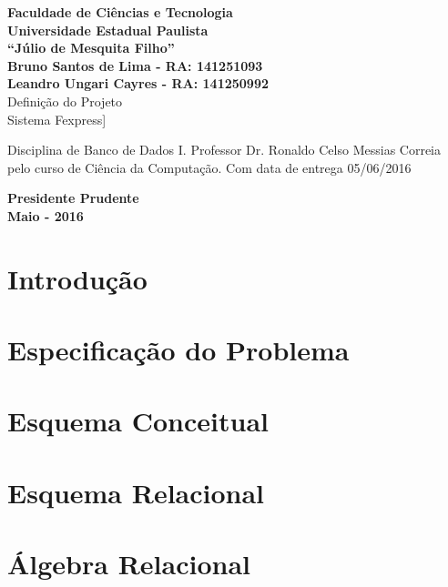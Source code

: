 \documentclass[12pt, onecolumn, titlepage]{article}
\begin{document}

\begin{titlepage} %
	
	\vfill
	\begin{center}
	
		{\large \textbf{Faculdade de Ciências e Tecnologia\\Universidade Estadual Paulista\\``Júlio de Mesquita Filho''}} \\[3cm]
		{\large \textbf{Bruno Santos de Lima - RA: 141251093}}\\
		{\large \textbf{Leandro Ungari Cayres - RA: 141250992}}\\[3cm]
		{\Large Definição do Projeto}\\
		{\Large Sistema Fexpress]}\\[3cm]

	\hspace{.45\textwidth} %
	\begin{minipage}{.5\textwidth}
		\large Disciplina de Banco de Dados I. Professor Dr. Ronaldo Celso Messias Correia pelo curso de Ciência da Computação. Com data de entrega 05/06/2016 \\[0.5cm]
	\end{minipage}

	\vfill
	\vspace{1.5cm}
	
	\large \textbf{Presidente Prudente\\}
	\large \textbf{Maio - 2016}
	
	\end{center}
	
\end{titlepage}
\newpage

\renewcommand{\contentsname}{Índice}
\tableofcontents

\newpage

\section{Introdução}
\label{sect:introducao}


\section{Especificação do Problema}
\label{sect:especificacao}


\section{Esquema Conceitual}
\label{sect:conceitual}


\section{Esquema Relacional}
\label{sect:relacional}


\section{Álgebra Relacional}
\label{sect:algebra}
\end{document}
